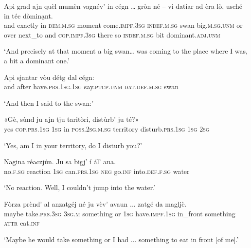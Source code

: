 \begin{linenumbers}
\gll Api grad ajn quèl mumèn vagnév’ in cégn … gròn né – vi datiar ad èra lò, 
usché in téc dòmina̱nt.\\
and exactly in \textsc{dem.m.sg} moment come.\textsc{impf.3sg} \textsc{indef.m.sg} swan {} big.\textsc{m.sg.unm} or {} over next\_to and \textsc{cop.impf.3sg} there so \textsc{indef.m.sg} bit dominant.\textsc{adj.unm}\\
\end{linenumbers}
\medskip
\glt `And precisely at that moment a big swan… was coming to the place where I was, a bit a dominant one.'
\medskip

\begin{linenumbers}
\gll  Api sjantar vòu détg dal cégn:  \\
and after have.\textsc{prs.1sg.1sg} say.\textsc{ptcp.unm} \textsc{dat.def.m.sg} swan \\
\end{linenumbers}
\medskip
\glt `And then I said to the swan:'
\medskip

\begin{linenumbers}
\gll «Gè, sùnd ju ajn tju taritòri, distùrb’ ju té?»   \\
yes \textsc{cop.prs.1sg} \textsc{1sg} in \textsc{poss.2sg.m.sg} territory disturb.\textsc{prs.1sg} \textsc{1sg} \textsc{2sg} \\
\end{linenumbers}
\medskip
\glt `Yes, am I in your territory, do I disturb you?'
\medskip

\begin{linenumbers}
\gll  Nagina réaczjún. Ju sa bigj’ í ál’ aua.\\
no.\textsc{f.sg} reaction \textsc{1sg} can.\textsc{prs.1sg} \textsc{neg} go.\textsc{inf} into.\textsc{def.f.sg} water \\
\end{linenumbers}
\medskip
\glt `No reaction. Well, I couldn’t jump into the water.'
\medskip

\begin{linenumbers}
\gll Fòrza prènd’ al anzatgéj né ju vèv’ avaun ... zatgé da magljè.  \\
maybe take.\textsc{prs.3sg} \textsc{3sg.m} something or \textsc{1sg} have.\textsc{impf.1sg} in\_front {} something \textsc{attr} eat.\textsc{inf}\\
\end{linenumbers}
\medskip
\glt `Maybe he would take something or I had ... something to eat in front [of me].'
\medskip

